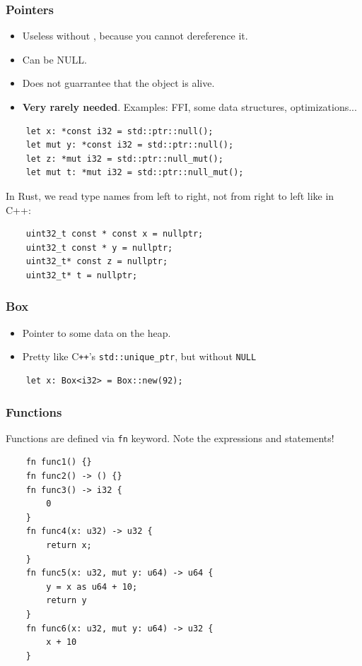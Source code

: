 \documentclass[aspectratio=1610,t]{beamer}
\begin{document}
\begin{frame}[fragile]
\frametitle{Pointers}
\begin{itemize}
    \item Useless without , because you cannot dereference it.
    \item Can be NULL.
    \item Does not guarrantee that the object is alive.
    \item \textbf{Very rarely needed}. Examples: FFI, some data structures, optimizations...
\end{itemize}

\begin{verbatim}
    let x: *const i32 = std::ptr::null();
    let mut y: *const i32 = std::ptr::null();
    let z: *mut i32 = std::ptr::null_mut();
    let mut t: *mut i32 = std::ptr::null_mut();
\end{verbatim}

In Rust, we read type names from left to right, not from right to left like in C++:

\begin{verbatim}
    uint32_t const * const x = nullptr;
    uint32_t const * y = nullptr;
    uint32_t* const z = nullptr;
    uint32_t* t = nullptr;
\end{verbatim}
\end{frame}


\begin{frame}[fragile]
\frametitle{Box}
\begin{itemize}
    \item Pointer to some data on the heap.
    \item Pretty like C\texttt{++}'s \texttt{std::unique\_ptr}, but without \texttt{NULL}
\end{itemize}

\begin{verbatim}
    let x: Box<i32> = Box::new(92);
\end{verbatim}
\end{frame}


\begin{frame}[fragile]
\frametitle{Functions}
Functions are defined via \texttt{fn} keyword. Note the expressions and statements!

\begin{verbatim}
    fn func1() {}
    fn func2() -> () {}
    fn func3() -> i32 {
        0
    }
    fn func4(x: u32) -> u32 {
        return x;
    }
    fn func5(x: u32, mut y: u64) -> u64 {
        y = x as u64 + 10;
        return y
    }
    fn func6(x: u32, mut y: u64) -> u32 {
        x + 10
    }
\end{verbatim}
\end{frame}
\end{document}
